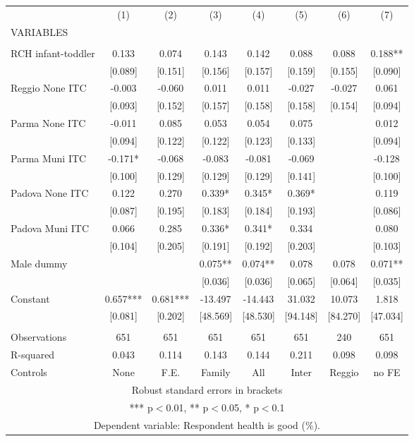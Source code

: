\begin{tabular}{lccccccc} \hline
 & (1) & (2) & (3) & (4) & (5) & (6) & (7) \\
VARIABLES &  &  &  &  &  &  &  \\ \hline
 &  &  &  &  &  &  &  \\
RCH infant-toddler & 0.133 & 0.074 & 0.143 & 0.142 & 0.088 & 0.088 & 0.188** \\
 & [0.089] & [0.151] & [0.156] & [0.157] & [0.159] & [0.155] & [0.090] \\
Reggio None ITC & -0.003 & -0.060 & 0.011 & 0.011 & -0.027 & -0.027 & 0.061 \\
 & [0.093] & [0.152] & [0.157] & [0.158] & [0.158] & [0.154] & [0.094] \\
Parma None ITC & -0.011 & 0.085 & 0.053 & 0.054 & 0.075 &  & 0.012 \\
 & [0.094] & [0.122] & [0.122] & [0.123] & [0.133] &  & [0.094] \\
Parma Muni ITC & -0.171* & -0.068 & -0.083 & -0.081 & -0.069 &  & -0.128 \\
 & [0.100] & [0.129] & [0.129] & [0.129] & [0.141] &  & [0.100] \\
Padova None ITC & 0.122 & 0.270 & 0.339* & 0.345* & 0.369* &  & 0.119 \\
 & [0.087] & [0.195] & [0.183] & [0.184] & [0.193] &  & [0.086] \\
Padova Muni ITC & 0.066 & 0.285 & 0.336* & 0.341* & 0.334 &  & 0.080 \\
 & [0.104] & [0.205] & [0.191] & [0.192] & [0.203] &  & [0.103] \\
Male dummy &  &  & 0.075** & 0.074** & 0.078 & 0.078 & 0.071** \\
 &  &  & [0.036] & [0.036] & [0.065] & [0.064] & [0.035] \\
Constant & 0.657*** & 0.681*** & -13.497 & -14.443 & 31.032 & 10.073 & 1.818 \\
 & [0.081] & [0.202] & [48.569] & [48.530] & [94.148] & [84.270] & [47.034] \\
 &  &  &  &  &  &  &  \\
Observations & 651 & 651 & 651 & 651 & 651 & 240 & 651 \\
R-squared & 0.043 & 0.114 & 0.143 & 0.144 & 0.211 & 0.098 & 0.098 \\
 Controls & None & F.E. & Family & All & Inter & Reggio & no FE \\ \hline
\multicolumn{8}{c}{ Robust standard errors in brackets} \\
\multicolumn{8}{c}{ *** p$<$0.01, ** p$<$0.05, * p$<$0.1} \\
\multicolumn{8}{c}{ Dependent variable: Respondent health is good (\%).} \\
\end{tabular}
